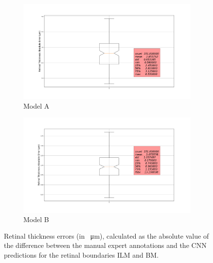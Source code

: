\documentclass[12pt,a4paper]{scrartcl}
\begin{document}
\begin{figure}[H]
\centering
\begin{subfigure}{1\textwidth}
  \centering
  \includegraphics[width=\linewidth]{./results/A_boxplot_Absolute_Error_retina.png}
  \caption{Model A}
  \label{fig:boxplot_a_retinal_thickness}
\end{subfigure}
\begin{subfigure}{1\textwidth}
  \centering
  \includegraphics[width=\linewidth]{./results/B_boxplot_Absolute_Error_retina.png}
  \caption{Model B}
  \label{fig:boxplot_b_retinal_thickness}
\end{subfigure}
\caption{Retinal thickness errors (in \SI{}{\micro\metre}), calculated as the absolute value of the difference between the manual expert annotations and the CNN predictions for the retinal boundaries ILM and BM. }
\label{fig:retinal_thickness_boxplots}
\end{figure}
\end{document}
